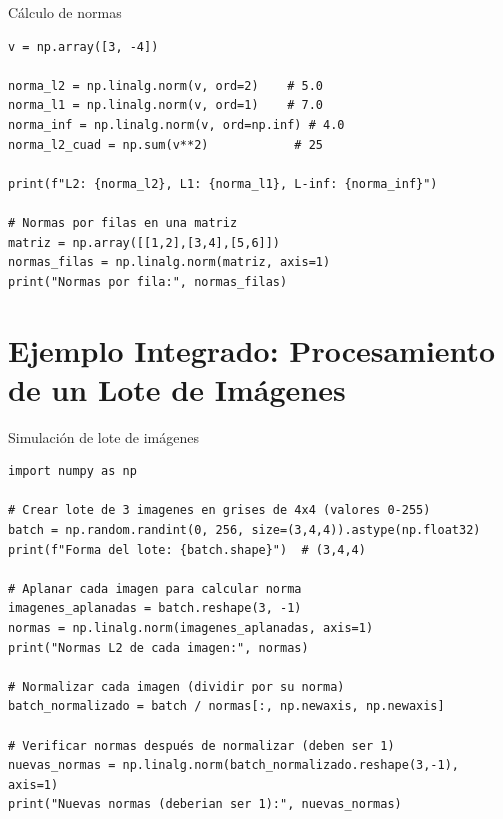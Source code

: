 \documentclass[aspectratio=169, 10pt, xcolor=table]{beamer}
\begin{document}
\begin{frame}[fragile]{Cálculo de normas}
    \begin{lstlisting}
v = np.array([3, -4])

norma_l2 = np.linalg.norm(v, ord=2)    # 5.0
norma_l1 = np.linalg.norm(v, ord=1)    # 7.0
norma_inf = np.linalg.norm(v, ord=np.inf) # 4.0
norma_l2_cuad = np.sum(v**2)            # 25

print(f"L2: {norma_l2}, L1: {norma_l1}, L-inf: {norma_inf}")

# Normas por filas en una matriz
matriz = np.array([[1,2],[3,4],[5,6]])
normas_filas = np.linalg.norm(matriz, axis=1)
print("Normas por fila:", normas_filas)
    \end{lstlisting}
\end{frame}

\section{Ejemplo Integrado: Procesamiento de un Lote de Imágenes}

\begin{frame}[fragile]{Simulación de lote de imágenes}
    \begin{lstlisting}
import numpy as np

# Crear lote de 3 imagenes en grises de 4x4 (valores 0-255)
batch = np.random.randint(0, 256, size=(3,4,4)).astype(np.float32)
print(f"Forma del lote: {batch.shape}")  # (3,4,4)

# Aplanar cada imagen para calcular norma
imagenes_aplanadas = batch.reshape(3, -1)
normas = np.linalg.norm(imagenes_aplanadas, axis=1)
print("Normas L2 de cada imagen:", normas)

# Normalizar cada imagen (dividir por su norma)
batch_normalizado = batch / normas[:, np.newaxis, np.newaxis]

# Verificar normas después de normalizar (deben ser 1)
nuevas_normas = np.linalg.norm(batch_normalizado.reshape(3,-1), axis=1)
print("Nuevas normas (deberian ser 1):", nuevas_normas)
    \end{lstlisting}
\end{frame}

\end{document}
